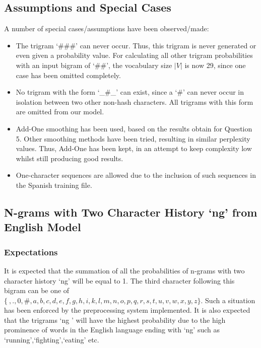 \documentclass[12pt]{article}
\begin{document}
\subsection{Assumptions and Special Cases}\label{assum}
A number of special cases/assumptions have been observed/made:
\begin{itemize}
	\item The trigram `\#\#\#' can never occur.  Thus, this trigram is never generated or even given a probability value.  For calculating all other trigram probabilities with an input bigram of `\#\#', the vocabulary size $|V|$ is now 29, since one case has been omitted completely.
	\item No trigram with the form `\_\#\_' can exist, since a `\#' can never occur in isolation between two other non-hash characters.  All trigrams with this form are omitted from our model.
	\item Add-One smoothing has been used, based on the results obtain for Question 5.  Other smoothing methods have been tried, resulting in similar perplexity values.  Thus, Add-One has been kept, in an attempt to keep complexity low whilst still producing good results.
	\item  One-character sequences are allowed due to the inclusion of such sequences in the Spanish training file.
\end{itemize}
\subsection{N-grams with Two Character History `ng' from English Model}
\subsubsection{Expectations}
It is expected that the summation of all the probabilities of n-grams with two character history `ng' will be equal to 1. The third character following this bigram can be one of $\{ \ ,.,0,\#,a,b,c,d,e,f,g,h,i,k,l,m,n,o,p,q,r,s,t,u,v,w,x,y,z\}$.  Such a situation has been enforced by the preprocessing system implemented.  It is also expected that the trigrams `ng ' will have the highest probability due to the high prominence of words in the English language ending with `ng' such as `running',`fighting',`eating' etc.   
\end{document}
